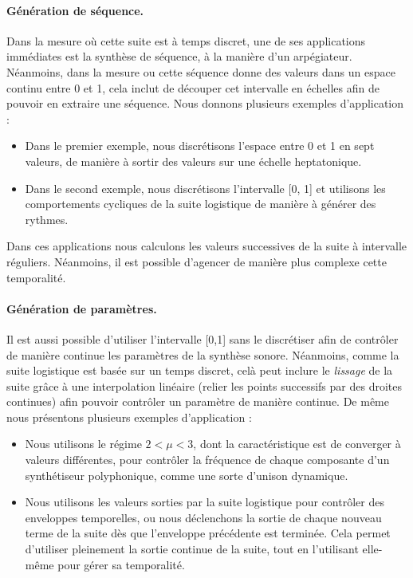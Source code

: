 \documentclass[12pt,a4paper]{article}
\begin{document}
\paragraph{Génération de séquence.} Dans la mesure où cette suite est à temps discret, une de ses applications immédiates est la synthèse de séquence, à la manière d'un arpégiateur. Néanmoins, dans la mesure ou cette séquence donne des valeurs dans un espace continu entre 0 et 1, cela inclut de découper cet intervalle en échelles afin de pouvoir en extraire une séquence. Nous donnons plusieurs exemples d'application : 
\begin{itemize}
\item Dans le premier exemple, nous discrétisons l'espace entre 0 et 1 en sept valeurs, de manière à sortir des valeurs sur une échelle heptatonique.
\item Dans le second exemple, nous discrétisons l'intervalle [0, 1] et utilisons les comportements cycliques de la suite logistique de manière à générer des rythmes. 
\end{itemize}
Dans ces applications nous calculons les valeurs successives de la suite à intervalle réguliers. Néanmoins, il est possible d'agencer de manière plus complexe cette temporalité.

\paragraph{Génération de paramètres.} Il est aussi possible d'utiliser l'intervalle [0,1] sans le discrétiser afin de contrôler de manière continue les paramètres de la synthèse sonore. Néanmoins, comme la suite logistique est basée sur un temps discret, celà peut inclure le \textit{lissage} de la suite grâce à une interpolation linéaire (relier les points successifs par des droites continues) afin pouvoir contrôler un paramètre de manière continue. De même nous présentons plusieurs exemples d'application :
\begin{itemize}
\item Nous utilisons le régime $ 2 < \mu < 3$, dont la caractéristique est de converger à valeurs différentes, pour contrôler la fréquence de chaque composante d'un synthétiseur polyphonique, comme une sorte d'unison dynamique. 
\item Nous utilisons les valeurs sorties par la suite logistique pour contrôler des enveloppes temporelles, ou nous déclenchons la sortie de chaque nouveau terme de la suite dès que l'enveloppe précédente est terminée. Cela permet d'utiliser pleinement la sortie continue de la suite, tout en l'utilisant elle-même pour gérer sa temporalité.
\end{itemize}
\end{document}
